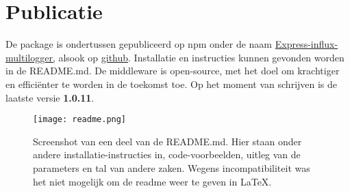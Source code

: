 \section{Publicatie}
\label{sec:publication}

De package is ondertussen gepubliceerd op npm onder de naam \href{https://www.npmjs.com/package/express-influx-multilogger}{Express-influx-multilogger,} alsook op \href{https://github.com/LeunensMichiel/express-influx-multilogger}{github}. Installatie en instructies kunnen gevonden worden in de README.md. De middleware is open-source, met het doel om krachtiger en efficiënter te worden in de toekomst toe. Op het moment van schrijven is de laatste versie \textbf{1.0.11}.

\begin{figure}[h]
	\centering
	\texttt{[image: readme.png]}
	\caption{Screenshot van een deel van de README.md. Hier staan onder andere installatie-instructies in, code-voorbeelden, uitleg van de parameters en tal van andere zaken. Wegens incompatibiliteit was het niet mogelijk om de readme weer te geven in LaTeX.}
	\label{fig:readme}
\end{figure}
